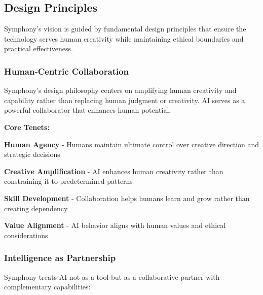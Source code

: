 \subsection{Design Principles}
\label{subsec:design-principles}

Symphony's vision is guided by fundamental design principles that ensure the technology serves human creativity while maintaining ethical boundaries and practical effectiveness.

\subsubsection{Human-Centric Collaboration}

\begin{infobox}[title={Principle: Amplify, Don't Replace}]
Symphony's design philosophy centers on amplifying human creativity and capability rather than replacing human judgment or creativity. AI serves as a powerful collaborator that enhances human potential.
\end{infobox}

\textbf{Core Tenets:}

\begin{expandedlist}
    \item \textbf{Human Agency} - Humans maintain ultimate control over creative direction and strategic decisions
    
    \item \textbf{Creative Amplification} - AI enhances human creativity rather than constraining it to predetermined patterns
    
    \item \textbf{Skill Development} - Collaboration helps humans learn and grow rather than creating dependency
    
    \item \textbf{Value Alignment} - AI behavior aligns with human values and ethical considerations
\end{expandedlist}

\subsubsection{Intelligence as Partnership}

Symphony treats AI not as a tool but as a collaborative partner with complementary capabilities:

